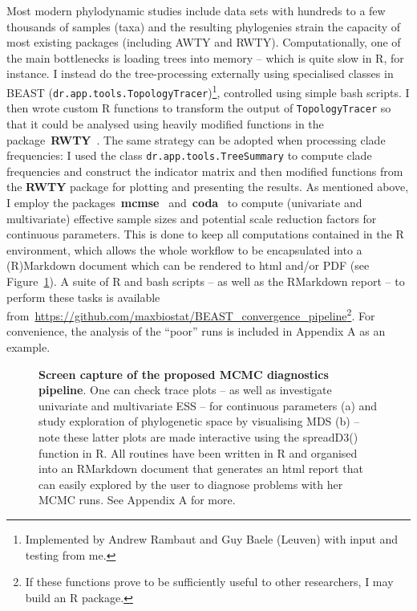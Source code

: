 Most modern phylodynamic studies include data sets with hundreds to a few thousands of samples (taxa) and the resulting phylogenies strain the capacity of most existing packages (including AWTY and RWTY).
Computationally, one of the main bottlenecks is loading trees into memory -- which is quite slow in R, for instance.
I instead do the tree-processing externally using specialised classes in BEAST (\verb|dr.app.tools.TopologyTracer|)\footnote{Implemented by Andrew Rambaut and Guy Baele (Leuven) with input and testing from me.}, controlled using simple bash scripts.
I then wrote custom R functions to transform the output of \verb|TopologyTracer| so that it could be analysed using heavily modified functions in the package~\textbf{RWTY}~\cite{Warren2017}.
The same strategy can be adopted when processing clade frequencies: I used the class \verb|dr.app.tools.TreeSummary| to compute clade frequencies and construct the indicator matrix and then modified functions from the \textbf{RWTY} package for plotting and presenting the results.
As mentioned above, I employ the packages~\textbf{mcmse}~\citep{Flegal2017} and~\textbf{coda}~\citep{Plummer2006} to compute (univariate and multivariate) effective sample sizes and potential scale reduction factors for continuous parameters.
This is done to keep all computations contained in the R environment, which allows the whole workflow to be encapsulated into a (R)Markdown document which can be rendered to html and/or PDF (see Figure~\ref{fig:pipeline}).
A suite of R and bash scripts -- as well as the RMarkdown report --  to perform these tasks is available from~\url{https://github.com/maxbiostat/BEAST_convergence_pipeline}\footnote{If these functions prove to be sufficiently useful to other researchers, I may build an R package.}.
For convenience, the analysis of the ``poor'' runs is included in Appendix A as an example.
\begin{figure}[!ht]
\begin{center}
\end{center}
 \caption[Screen capture of the proposed MCMC diagnostics pipeline.]{\textbf{Screen capture of the proposed MCMC diagnostics pipeline}.
One can check  trace plots -- as well as investigate univariate and multivariate ESS -- for continuous parameters (a) and study exploration of phylogenetic space by visualising MDS (b) -- note these latter plots are made interactive  using the spreadD3() function in R.
All routines have been written in R and organised into an RMarkdown document that generates an html report that can easily explored by the user to diagnose problems with her MCMC runs.
See Appendix A for more.
 }
 \label{fig:pipeline}
\end{figure}

